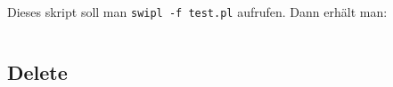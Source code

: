 Dieses skript soll man \texttt{swipl -f test.pl} aufrufen. Dann erhält man:

\inputminted[numbersep=5pt, tabsize=4]{prolog}{scripts/prolog/splits.sh}

\subsection{Delete}%
\inputminted[numbersep=5pt, tabsize=4]{prolog}{scripts/prolog/delete.pl}




